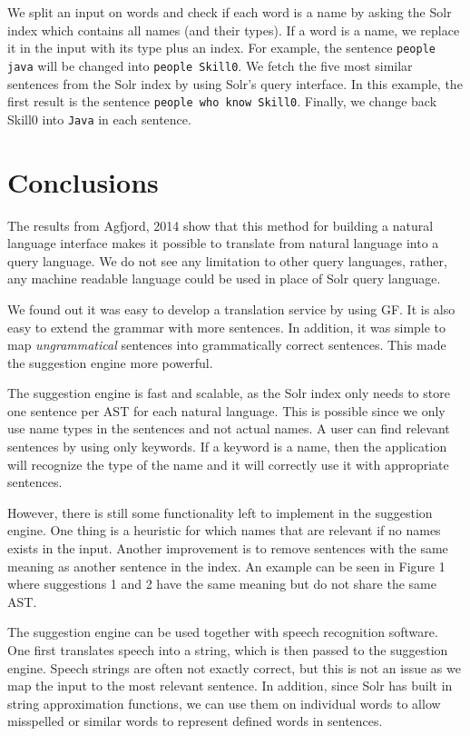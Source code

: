 \documentclass[10pt, a4paper]{article}
\begin{document}
 We split an input on words and check if each word is a name by asking the Solr index which contains all names (and their types). If a word is a name, we replace it in the input with its type plus an index. For example, the sentence \texttt{people java} will be changed into \texttt{people Skill0}. We fetch the five most similar sentences from the Solr index by using Solr's query interface. In this example, the first result is the sentence \texttt{people who know Skill0}. Finally, we change back Skill0 into \texttt{Java} in each sentence.

\section{Conclusions}
The results from Agfjord, 2014 show that this method for building 
a natural language interface makes it possible to translate from 
natural language into a query language. We do not see any limitation to other query languages, rather, any machine readable language could be used in place of Solr query language.

We found out it was easy to develop a translation service by using GF. 
It is also easy to extend the grammar with more sentences. 
In addition, it was simple to map \emph{ungrammatical} sentences into 
grammatically correct sentences. This made the suggestion engine more powerful.

The suggestion engine is fast and scalable, 
as the Solr index only needs to store one sentence per AST for 
each natural language. This is possible since we only use name types in 
the sentences and not actual names. A user can find relevant sentences 
by using only keywords. If a keyword is a name, then the application 
will recognize the type of the name and it will correctly use it 
with appropriate sentences.

However, there is still some functionality left to implement in 
the suggestion engine. One thing is a heuristic for which names 
that are relevant if no names exists in the input. 
Another improvement is to remove sentences with 
the same meaning as another sentence in the index. An example 
can be seen in Figure 1 where suggestions 1 and 2 have the same meaning but do not share the same AST.

The suggestion engine can be used together with speech recognition software. 
One first translates speech into a string, which is then passed to the suggestion engine. Speech strings are often not exactly correct, but this is not an issue as we map the input to the most relevant sentence. In addition, since Solr has built in string approximation functions, we can use them on individual words to allow misspelled or similar words to represent defined words in sentences.
\end{document}
